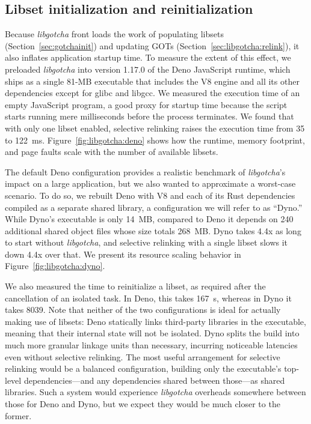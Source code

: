 \subsection{Libset initialization and reinitialization}

Because \textit{libgotcha} front loads the work of populating libsets
(Section~\ref{sec:gotchainit}) and updating GOTs
(Section~\ref{sec:libgotcha:relink}), it also inflates application startup time.  To
measure the extent of this effect, we preloaded \textit{libgotcha} into version
1.17.0 of the Deno JavaScript runtime, which ships as a single 81-MB executable that
includes the V8 engine and all its other dependencies except for glibc and libgcc.
We measured the execution time of an empty JavaScript program, a good proxy for
startup time because the script starts running mere milliseconds before the process
terminates.  We found that with only one libset enabled, selective relinking raises
the execution time from 35 to 122~ms.  Figure~\ref{fig:libgotcha:deno} shows how the
runtime, memory footprint, and page faults scale with the number of available
libsets.

The default Deno configuration provides a realistic benchmark of \textit{libgotcha}'s
impact on a large application, but we also wanted to approximate a worst-case
scenario.  To do so, we rebuilt Deno with V8 and each of its Rust dependencies
compiled as a separate shared library, a configuration we will refer to as ``Dyno.''
While Dyno's executable is only 14~MB, compared to Deno it depends on 240 additional
shared object files whose size totals 268~MB.  Dyno takes 4.4x as long to start
without \textit{libgotcha}, and selective relinking with a single libset slows it
down 4.4x over that.  We present its resource scaling behavior in
Figure~\ref{fig:libgotcha:dyno}.

We also measured the time to reinitialize a libset, as required after the
cancellation of an isolated task.  In Deno, this takes 167~\textmu{}s, whereas in
Dyno it takes 8039.  Note that neither of the two configurations is ideal for
actually making use of libsets:  Deno statically links third-party libraries in the
executable, meaning that their internal state will not be isolated.  Dyno splits the
build into much more granular linkage units than necessary, incurring noticeable
latencies even without selective relinking.  The most useful arrangement for
selective relinking would be a balanced configuration, building only the executable's
top-level dependencies---and any dependencies shared between those---as shared
libraries.  Such a system would experience \textit{libgotcha} overheads somewhere
between those for Deno and Dyno, but we expect they would be much closer to the
former.

